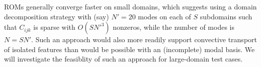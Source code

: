 ROMs generally converge faster on small domains, which suggests using
a domain decomposition strategy with (say) $N'=20$ modes on each of $S$
subdomains such that $C_{ijk}$ is sparse with $O(SN'^3)$ nonzeros,
while the number of modes is $N=SN'$.  Such an approach would also
more readily support convective transport of isolated features than
would be possible with an (incomplete) modal basis.  We will investigate
the feasiblity of such an approach for large-domain test cases.


